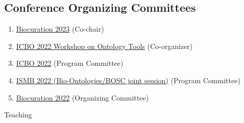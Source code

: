 \documentclass[10pt,a4paper,sans]{moderncv} %
\begin{document}
    \subsection{Conference Organizing Committees}
    \begin{enumerate}
        \item \href{https://bioregistry.io/wikidata:Q111430238?provider=scholia}{Biocuration 2023} (Co-chair)
        \item \href{https://icbo-conference.github.io/icbo2022/workshops-and-tutorials/#workshop-on-ontology-tools-and-workflows}{ICBO 2022 Workshop on Ontology Tools} (Co-organizer)
        \item \href{https://icbo-conference.github.io/icbo2022/program-committee}{ICBO 2022} (Program Committee)
        \item \href{https://www.iscb.org/ismb2022-program/abstracts/bio-ontologies}{ISMB 2022 (Bio-Ontologies/BOSC joint session)} (Program Committee)
        \item \href{https://bioregistry.io/wikidata:Q109407979?provider=scholia}{Biocuration 2022} (Organizing Committee)
    \end{enumerate}

\hfill \break
{\huge Teaching}
\end{document}
